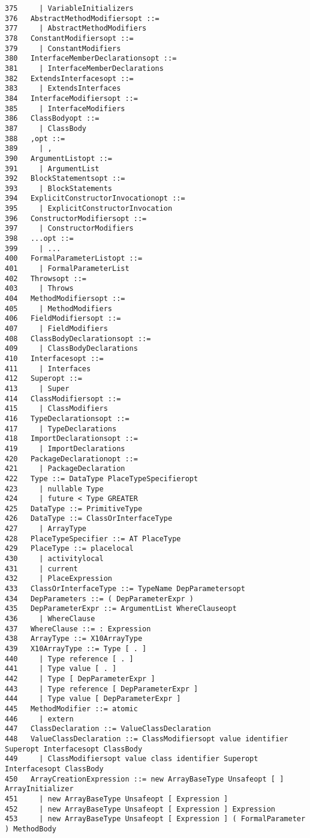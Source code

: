 {\begin{verbatim}
375     | VariableInitializers
376   AbstractMethodModifiersopt ::=
377     | AbstractMethodModifiers
378   ConstantModifiersopt ::=
379     | ConstantModifiers
380   InterfaceMemberDeclarationsopt ::=
381     | InterfaceMemberDeclarations
382   ExtendsInterfacesopt ::=
383     | ExtendsInterfaces
384   InterfaceModifiersopt ::=
385     | InterfaceModifiers
386   ClassBodyopt ::=
387     | ClassBody
388   ,opt ::=
389     | ,
390   ArgumentListopt ::=
391     | ArgumentList
392   BlockStatementsopt ::=
393     | BlockStatements
394   ExplicitConstructorInvocationopt ::=
395     | ExplicitConstructorInvocation
396   ConstructorModifiersopt ::=
397     | ConstructorModifiers
398   ...opt ::=
399     | ...
400   FormalParameterListopt ::=
401     | FormalParameterList
402   Throwsopt ::=
403     | Throws
404   MethodModifiersopt ::=
405     | MethodModifiers
406   FieldModifiersopt ::=
407     | FieldModifiers
408   ClassBodyDeclarationsopt ::=
409     | ClassBodyDeclarations
410   Interfacesopt ::=
411     | Interfaces
412   Superopt ::=
413     | Super
414   ClassModifiersopt ::=
415     | ClassModifiers
416   TypeDeclarationsopt ::=
417     | TypeDeclarations
418   ImportDeclarationsopt ::=
419     | ImportDeclarations
420   PackageDeclarationopt ::=
421     | PackageDeclaration
422   Type ::= DataType PlaceTypeSpecifieropt
423     | nullable Type
424     | future < Type GREATER
425   DataType ::= PrimitiveType
426   DataType ::= ClassOrInterfaceType
427     | ArrayType
428   PlaceTypeSpecifier ::= AT PlaceType
429   PlaceType ::= placelocal
430     | activitylocal
431     | current
432     | PlaceExpression
433   ClassOrInterfaceType ::= TypeName DepParametersopt
434   DepParameters ::= ( DepParameterExpr )
435   DepParameterExpr ::= ArgumentList WhereClauseopt
436     | WhereClause
437   WhereClause ::= : Expression
438   ArrayType ::= X10ArrayType
439   X10ArrayType ::= Type [ . ]
440     | Type reference [ . ]
441     | Type value [ . ]
442     | Type [ DepParameterExpr ]
443     | Type reference [ DepParameterExpr ]
444     | Type value [ DepParameterExpr ]
445   MethodModifier ::= atomic
446     | extern
447   ClassDeclaration ::= ValueClassDeclaration
448   ValueClassDeclaration ::= ClassModifiersopt value identifier Superopt Interfacesopt ClassBody
449     | ClassModifiersopt value class identifier Superopt Interfacesopt ClassBody
450   ArrayCreationExpression ::= new ArrayBaseType Unsafeopt [ ] ArrayInitializer
451     | new ArrayBaseType Unsafeopt [ Expression ]
452     | new ArrayBaseType Unsafeopt [ Expression ] Expression
453     | new ArrayBaseType Unsafeopt [ Expression ] ( FormalParameter ) MethodBody

\end{verbatim}}
